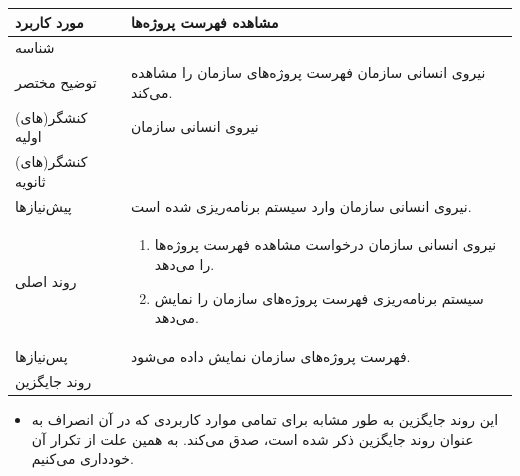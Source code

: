 \begin{table}[H]
	\centering
	\begin{tabular}{|p{3cm}|p{10cm}|}
		\hline
		
		مورد کاربرد & مشاهده فهرست پروژه‌ها  \\
		\hline
		
		شناسه & 
		\stepcounter{usecase_ID}
		
		\arabic{usecase_ID} \\
		\hline
		
		توضیح مختصر & نیروی انسانی سازمان فهرست پروژه‌های سازمان را مشاهده می‌کند. \\
		\hline
		
		کنشگر(های) اولیه & نیروی انسانی سازمان \\
		\hline
		
		کنشگر(های) ثانویه &  \\
		\hline
		
		پیش‌نیازها & نیروی انسانی سازمان وارد سیستم برنامه‌ریزی شده است. \\
		\hline
		
		
		روند اصلی &
		\begin{enumerate}[topsep=0cm,leftmargin=0.5cm]
			
			\item نیروی انسانی سازمان درخواست مشاهده فهرست پروژه‌ها را می‌دهد.
			\item سیستم برنامه‌ریزی فهرست پروژه‌های سازمان را نمایش می‌دهد.
		\end{enumerate} \\
		
		\hline
		
		پس‌نیازها & فهرست پروژه‌های سازمان نمایش داده می‌شود. \\
		\hline
		
		روند جایگزین &  \\
		\hline
		
	\end{tabular}
\end{table}

\begin{itemize}
	\item این روند جایگزین به طور مشابه برای تمامی موارد کاربردی که در آن انصراف به عنوان روند جایگزین ذکر شده است، صدق می‌کند. به همین علت از تکرار آن خودداری می‌کنیم.
\end{itemize}

